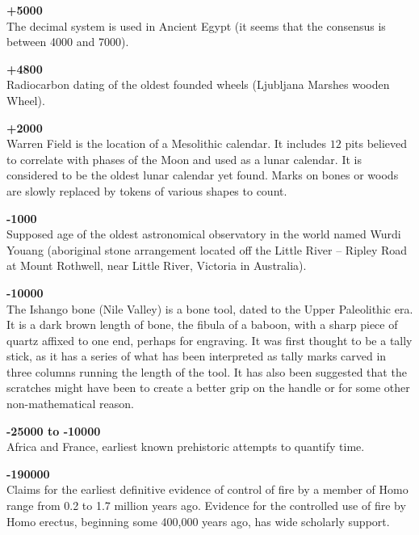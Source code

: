 \textbf{+5000}\\
The decimal system is used in Ancient Egypt (it seems that the consensus is between 4000 and 7000).

\textbf{+4800}\\
Radiocarbon dating of the oldest founded wheels (Ljubljana Marshes wooden Wheel).

\textbf{+2000}\\
Warren Field is the location of a Mesolithic calendar. It includes $12$ pits believed to correlate with phases of the Moon and used as a lunar calendar. It is considered to be the oldest lunar calendar yet found. Marks on bones or woods are slowly replaced by tokens of various shapes to count.

\textbf{-1000}\\
Supposed age of the oldest astronomical observatory in the world named Wurdi Youang (aboriginal stone arrangement located off the Little River – Ripley Road at Mount Rothwell, near Little River, Victoria in Australia).

\textbf{-10000}\\
The Ishango bone (Nile Valley) is a bone tool, dated to the Upper Paleolithic era. It is a dark brown length of bone, the fibula of a baboon, with a sharp piece of quartz affixed to one end, perhaps for engraving. It was first thought to be a tally stick, as it has a series of what has been interpreted as tally marks carved in three columns running the length of the tool. It has also been suggested that the scratches might have been to create a better grip on the handle or for some other non-mathematical reason.

\textbf{-25000 to -10000}\\
Africa and France, earliest known prehistoric attempts to quantify time.

\textbf{-190000}\\
Claims for the earliest definitive evidence of control of fire by a member of Homo range from 0.2 to 1.7 million years ago. Evidence for the controlled use of fire by Homo erectus, beginning some 400,000 years ago, has wide scholarly support.